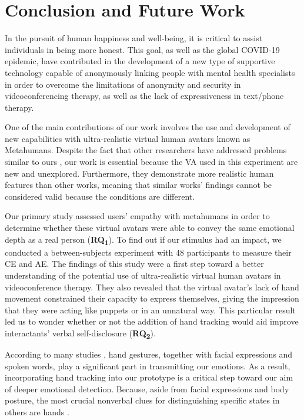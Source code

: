 \section{Conclusion and Future Work}
In the pursuit of human happiness and well-being, it is critical to assist individuals in being more honest. This goal, as well as the global COVID-19 epidemic, have contributed in the development of a new type of supportive technology capable of anonymously linking people with mental health specialists in order to overcome the limitations of anonymity and security in videoconferencing therapy, as well as the lack of expressiveness in text/phone therapy. 

One of the main contributions of our work involves the use and development of new capabilities with ultra-realistic virtual human avatars known as Metahumans. Despite the fact that other researchers have addressed problems similar to ours \cite{LU21, ZAL18, GRA07, LUC14, ROT19, KAN16, KAN10A, BAC19}, our work is essential because the VA used in this experiment are new and unexplored. Furthermore, they demonstrate more realistic human features than other works, meaning that similar works' findings cannot be considered valid because the conditions are different.

Our primary study assessed users' empathy with metahumans in order to determine whether these virtual avatars were able to convey the same emotional depth as a real person (\textbf{RQ\textsubscript{1}}). To find out if our stimulus had an impact, we conducted a between-subjects experiment with 48 participants to measure their CE and AE. The findings of this study were a first step toward a better understanding of the potential use of ultra-realistic virtual human avatars in videoconference therapy. They also revealed that the virtual avatar's lack of hand movement constrained their capacity to express themselves, giving the impression that they were acting like puppets or in an unnatural way. This particular result led us to wonder whether or not the addition of hand tracking would aid improve interactants' verbal self-disclosure (\textbf{RQ\textsubscript{2}}).

According to many studies \cite{ARJ20, WAX97, REI22}, hand gestures, together with facial expressions and spoken words, play a significant part in transmitting our emotions. As a result, incorporating hand tracking into our prototype is a critical step toward our aim of deeper emotional detection. Because, aside from facial expressions and body posture, the most crucial nonverbal clues for distinguishing specific states in others are hands \cite{WAX97, REI22}.


